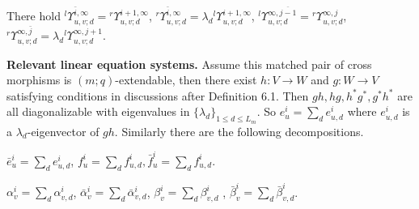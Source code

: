 \def\CTEXPreproc{Created by ctex v0.2.12, don't edit!}\documentclass[11pt]{article}
\begin{document}
    There hold
 ${}^l \Upsilon^{\bar{i},\infty}_{u,v;d}= {}^r \Upsilon^{i+1,\infty}_{u,v;d} $,
    ${}^r \Upsilon^{\bar{i},\infty}_{u,v;d}=\lambda_d {}^l \Upsilon^{i+1,\infty}_{u,v;d}$,
    ${}^{l}\Upsilon^{\infty,\overline{j-1}}_{u,v;d}={}^{r} \Upsilon^{\infty,j}_{u,v;d} $,
    ${}^r \Upsilon^{\infty,\bar{j}}_{u,v;d}=\lambda_d {}^l \Upsilon^{\infty,j+1}_{u,v;d}   $.




\noindent \textbf{Relevant linear equation systems. } Assume this matched pair of cross morphisms is $(m;q)$-extendable, then there
  exist $h:V\rightarrow W$ and $g:W\rightarrow V$ satisfying conditions in discussions after Definition 6.1.
  Then $gh, hg, h^{*} g^{*} , g^{*} h^{*}$ are all diagonalizable with eigenvalues in $\{ \lambda_d \}_{1\leq d\leq L_m }$. So
  $e^i _u =\sum_{d} e^i _{u,d} $ where $e^i _{u,d}$ is a $\lambda_d$-eigenvector of $g h$. Similarly there are the following decompositions.

  $\bar{e}^i _u = \sum_{d} e^i _{u,d} $,
  $f^i _u =\sum_{d} f^i _{u,d} ,  \bar{f}^i _u = \sum_{d} f^i _{u,d}  $.

  $\alpha^i _{v} =\sum_{d} \alpha^i _{v,d}$,
   $\bar{\alpha}^{i} _{v} =\sum_{d} \bar{\alpha}^{i}  _{v,d}$,
    $ \beta^{i} _{v} =\sum_{d} \beta^{i} _{v,d} $ ,
    $\bar{\beta}^i _{v} =\sum_{d} \bar{\beta}^{i} _{v,d}$.
\end{document}
